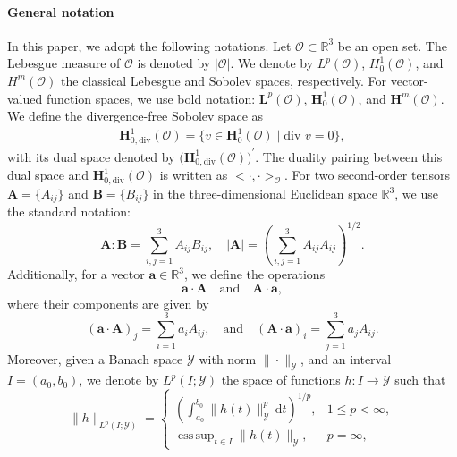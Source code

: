 \documentclass[a4paper,12pt,reqno,natbib]{amsart}
\newcommand{\dt} {\displaystyle\mathrm{d}t}
\def\O{\mathcal O}
\def\H{\textbf{H}}
\begin{document}
\paragraph{\bf{General notation}}  
In this paper, we adopt the following notations. Let \( \O \subset \mathbb{R}^3 \) be an open set. The Lebesgue measure of \( \O \) is denoted by \( |\O| \).  We denote by \( L^p(\O) \), \( H^1_0(\O) \), and \( H^m(\O) \) the classical Lebesgue and Sobolev spaces, respectively. For vector-valued function spaces, we use bold notation: \( \mathbf{L}^p(\O) \), \( \mathbf{H}^1_0(\O) \), and \( \mathbf{H}^m(\O) \). We define the divergence-free Sobolev space as  
\begin{align*}  
\H^1_{0,\text{div}}(\O) = \big\{ v \in \H^1_0(\O) \mid \text{div } v = 0 \big\},  
\end{align*}  
with its dual space denoted by \( \big(\H^1_{0,\text{div}}(\O)\big)^\prime \).  The duality pairing between this dual space and \( \H^1_{0,\text{div}}(\O) \) is written as \(\big<\cdot,\cdot\big>_\O\).
For two second-order tensors \( \boldsymbol{A} = \{A_{ij}\} \) and \( \boldsymbol{B} = \{B_{ij}\} \) in the three-dimensional Euclidean space \( \mathbb{R}^3 \), we use the standard notation:  
\begin{equation*}
\boldsymbol{A} : \boldsymbol{B} = \sum_{i, j=1}^{3} A_{ij} B_{ij},  
\quad |\boldsymbol{A}| = \left( \sum_{i, j=1}^{3} A_{ij} A_{ij} \right)^{1 / 2}.  
\end{equation*}  
Additionally, for a vector \( \boldsymbol{a} \in \mathbb{R}^3 \), we define the operations  
\begin{equation*}
\boldsymbol{a} \cdot \boldsymbol{A} \quad \text{and} \quad \boldsymbol{A} \cdot \boldsymbol{a},  
\end{equation*}  
where their components are given by  
\begin{equation*}
(\boldsymbol{a} \cdot \boldsymbol{A})_j = \sum_{i=1}^{3} a_i A_{ij},  
\quad \text{and} \quad  
(\boldsymbol{A} \cdot \boldsymbol{a})_i = \sum_{j=1}^{3} a_j A_{ij}.  
\end{equation*}  
Moreover, given a Banach space \( \mathcal{Y} \) with norm \( \|\cdot\|_\mathcal{Y} \), and an interval \( I = (a_0, b_0) \), we denote by \( L^p(I; \mathcal{Y}) \) the space of functions \( h: I \rightarrow \mathcal{Y} \) such that  
\begin{equation*}
\|h\|_{L^p(I; \mathcal{Y})} =  
\begin{cases}  
\displaystyle\left(\int_{a_0}^{b_0} \|h(t)\|_\mathcal{Y}^p \,\dt \right)^{1/p}, & 1 \leq p < \infty, \\  
\displaystyle\operatorname{ess\,sup}_{t \in I} \|h(t)\|_\mathcal{Y}, & p = \infty,  
\end{cases}  
\end{equation*}  
\end{document}
